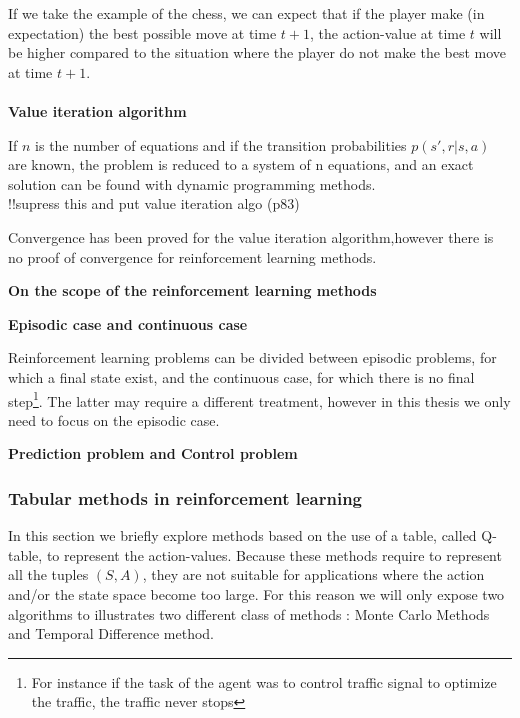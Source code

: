 \documentclass[11pt, onecolumn, a4paper]{report}
\begin{document}
If we take the example of the chess, we can expect that if the player make (in expectation) the best possible move at time $t+1$, the action-value at time $t$ will be higher compared to the situation where the player do not make the best move at time $t+1$.\\\\


\textbf{Value iteration algorithm}

If $n$ is the number of equations and if the transition probabilities $p(s',r|s,a)$ are known, the problem is reduced to a system of n equations, and an exact solution can be found with dynamic programming methods.\\

!!supress this and put value iteration algo (p83)


Convergence has been proved for the value iteration algorithm,however there is no proof of convergence for reinforcement learning methods.

\textbf{\large On the scope of the reinforcement learning methods}

\textbf{Episodic case and continuous case}

Reinforcement learning problems can be divided between episodic problems, for which a final state exist, and the continuous case, for which there is no final step\footnote{For instance if the task of the agent was to control traffic signal to optimize the traffic, the traffic never stops}. The latter may require a different treatment, however in this thesis we only need to focus on the episodic case.

\textbf{Prediction problem and Control problem}





\subsubsection{Tabular methods in reinforcement learning}


In this section we briefly explore methods based on the use of a table, called Q-table, to represent the action-values. Because these methods require to represent all the tuples $(S,A)$, they are not suitable for applications where the action and/or the state space become too large. For this reason we will only expose two algorithms to illustrates two different class of methods : Monte Carlo Methods and Temporal Difference method.\\
\end{document}
